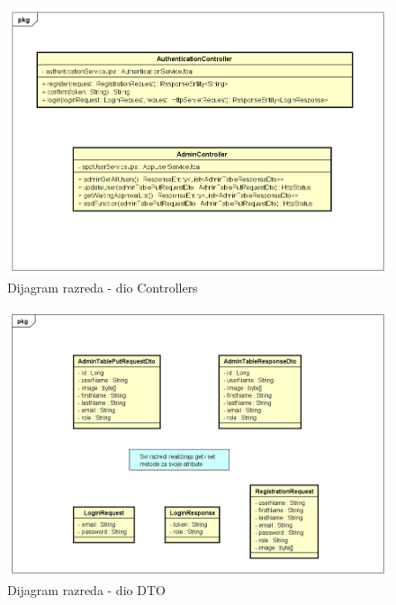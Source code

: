 			\begin{figure}[H]
				\includegraphics[scale=0.5]{dijagrami/Controllers.png} 
				\centering
				\caption{Dijagram razreda - dio Controllers}
				\label{fig:promjene}
			\end{figure}
			
			\begin{figure}[H]
				\includegraphics[scale=0.5]{dijagrami/DTO.png} 
				\centering
				\caption{Dijagram razreda - dio DTO}
				\label{fig:promjene}
			\end{figure}
			
